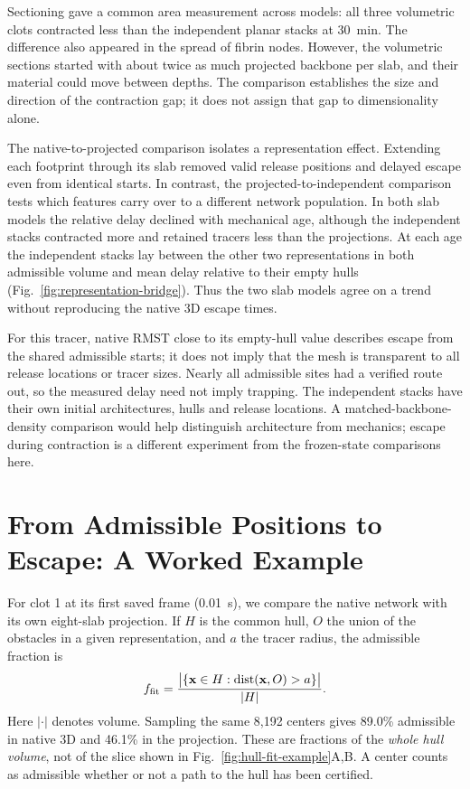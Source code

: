 \documentclass[twocolumn, 10pt]{article}
\begin{document}
Sectioning gave a common area measurement across models: all three volumetric clots contracted less than the independent planar stacks at 30~min. The difference also appeared in the spread of fibrin nodes. However, the volumetric sections started with about twice as much projected backbone per slab, and their material could move between depths. The comparison establishes the size and direction of the contraction gap; it does not assign that gap to dimensionality alone.

The native-to-projected comparison isolates a representation effect. Extending each footprint through its slab removed valid release positions and delayed escape even from identical starts. In contrast, the projected-to-independent comparison tests which features carry over to a different network population. In both slab models the relative delay declined with mechanical age, although the independent stacks contracted more and retained tracers less than the projections. At each age the independent stacks lay between the other two representations in both admissible volume and mean delay relative to their empty hulls (Fig.~\ref{fig:representation-bridge}). Thus the two slab models agree on a trend without reproducing the native 3D escape times.

For this tracer, native RMST close to its empty-hull value describes escape from the shared admissible starts; it does not imply that the mesh is transparent to all release locations or tracer sizes. Nearly all admissible sites had a verified route out, so the measured delay need not imply trapping. The independent stacks have their own initial architectures, hulls and release locations. A matched-backbone-density comparison would help distinguish architecture from mechanics; escape during contraction is a different experiment from the frozen-state comparisons here.

\begingroup\small


\endgroup

\onecolumn
\appendix
\section{From Admissible Positions to Escape: A Worked Example}\label{app:hull-fit}
For clot 1 at its first saved frame (0.01~s), we compare the native network with its own eight-slab projection. If $H$ is the common hull, $O$ the union of the obstacles in a given representation, and $a$ the tracer radius, the admissible fraction is
\begin{equation}
 f_{\rm fit}=\frac{\big|\{\mathbf x\in H:\operatorname{dist}(\mathbf x,O)>a\}\big|}{|H|}.
\end{equation}
Here $|\cdot|$ denotes volume. Sampling the same 8,192 centers gives 89.0\% admissible in native 3D and 46.1\% in the projection. These are fractions of the \emph{whole hull volume}, not of the slice shown in Fig.~\ref{fig:hull-fit-example}A,B. A center counts as admissible whether or not a path to the hull has been certified.
\end{document}
